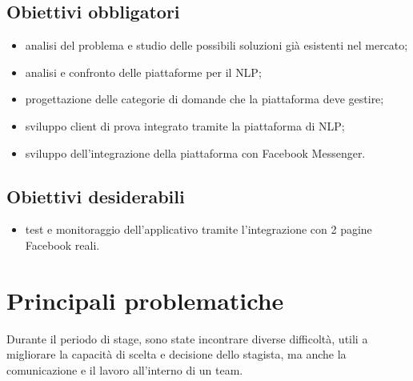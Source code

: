 \subsection{Obiettivi obbligatori}
\begin{itemize}
	\item analisi del problema e studio delle possibili soluzioni già esistenti nel mercato;
	\item analisi e confronto delle piattaforme per il \gls{NLP};
	\item progettazione delle categorie di domande che la piattaforma deve gestire;
	\item sviluppo client di prova integrato tramite la piattaforma di \gls{NLP};
	\item sviluppo dell'integrazione della piattaforma con Facebook Messenger.
\end{itemize}

\subsection{Obiettivi desiderabili}
\begin{itemize}
	\item test e monitoraggio dell’applicativo tramite l’integrazione con 2 pagine Facebook reali.
\end{itemize}

\section{Principali problematiche}
Durante il periodo di stage, sono state incontrare diverse difficoltà, utili a migliorare la capacità di scelta e decisione dello stagista, ma anche la comunicazione e il lavoro all'interno di un team.


